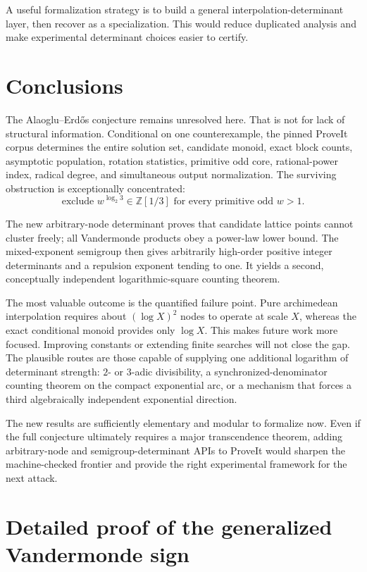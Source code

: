 \documentclass[11pt,oneside]{article}
\theoremstyle{definition}
\theoremstyle{remark}
\newcommand{\Z}{\mathbb Z}
\begin{document}
A useful formalization strategy is to build a general interpolation-determinant layer, then
recover  as a specialization.  This would reduce duplicated
analysis and make experimental determinant choices easier to certify.

\section{Conclusions}
\label{sec:conclusion}

The Alaoglu--Erd\H{o}s conjecture remains unresolved here.  That is not for lack of structural
information.  Conditional on one counterexample, the pinned ProveIt corpus determines the
entire solution set, candidate monoid, exact block counts, asymptotic population, rotation
statistics, primitive odd core, rational-power index, radical degree, and simultaneous output
normalization.  The surviving obstruction is exceptionally concentrated:
\[
 \text{exclude }w^{\log_2 3}\in\Z[1/3]
 \text{ for every primitive odd }w>1.
\]

The new arbitrary-node determinant proves that candidate lattice points cannot cluster freely;
all Vandermonde products obey a power-law lower bound.  The mixed-exponent semigroup then gives
arbitrarily high-order positive integer determinants and a repulsion exponent tending to one.
It yields a second, conceptually independent logarithmic-square counting theorem.

The most valuable outcome is the quantified failure point.  Pure archimedean interpolation
requires about $(\log X)^2$ nodes to operate at scale $X$, whereas the exact conditional monoid
provides only $\log X$.  This makes future work more focused.  Improving constants or extending
finite searches will not close the gap.  The plausible routes are those capable of supplying
one additional logarithm of determinant strength: $2$- or $3$-adic divisibility, a
synchronized-denominator counting theorem on the compact exponential arc, or a mechanism that
forces a third algebraically independent exponential direction.

The new results are sufficiently elementary and modular to formalize now.  Even if the full
conjecture ultimately requires a major transcendence theorem, adding arbitrary-node and
semigroup-determinant APIs to ProveIt would sharpen the machine-checked frontier and provide the
right experimental framework for the next attack.

\appendix

\section{Detailed proof of the generalized Vandermonde sign}
\label{app:gv-proof}
\end{document}
